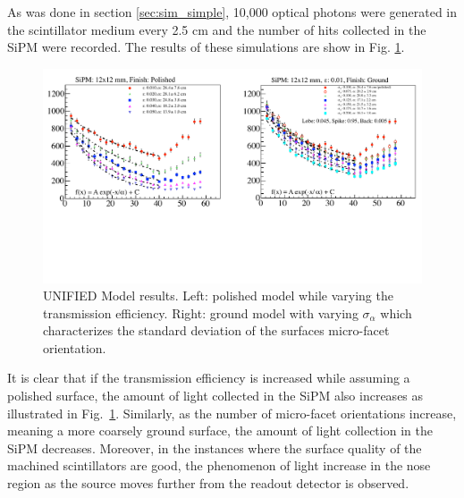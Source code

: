 As was done in section \ref{sec:sim_simple}, 10,000 optical photons were generated in the scintillator medium every 2.5 cm and the number of hits collected in the SiPM were recorded.  The results of these simulations are show in Fig. \ref{fig:transm_eff_vs_sig_alpha}.
	\begin{figure}[!htb]
	\centering
	\includegraphics[width=1.0\columnwidth]{simulation/figs/transm_eff_vs_sig_alpha}
	\caption{UNIFIED Model results.  Left: polished model while varying the transmission efficiency.  Right: ground model with varying $\sigma_{\alpha}$ which characterizes the standard deviation of the surfaces micro-facet orientation.}
	\label{fig:transm_eff_vs_sig_alpha}
	\end{figure}
It is clear that if the transmission efficiency is increased while assuming a polished surface, the amount of light collected in the SiPM also increases as illustrated in Fig.~\ref{fig:transm_eff_vs_sig_alpha}.  Similarly, as the number of micro-facet orientations increase, meaning a more coarsely ground surface, the amount of light collection in the SiPM decreases.  Moreover, in the instances where the surface quality of the machined scintillators are good, the phenomenon of light increase in the nose region as the source moves further from the readout detector is observed.

%